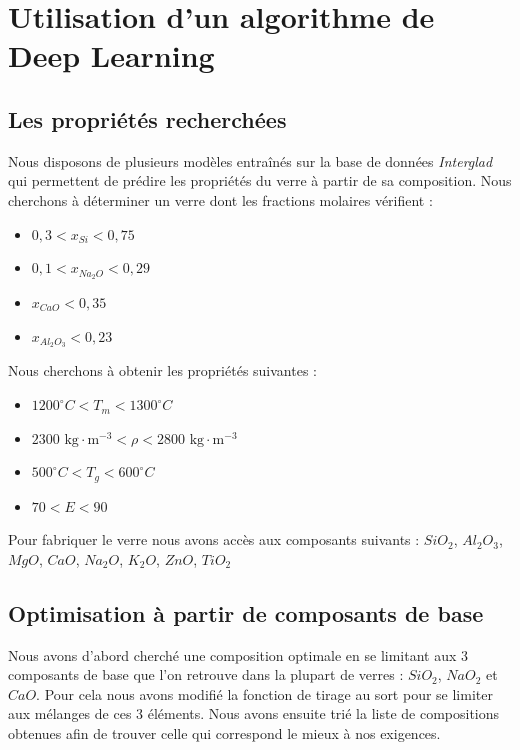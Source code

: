 \documentclass{article}
\begin{document}
\section{Utilisation d'un algorithme de Deep Learning}
\subsection{Les propriétés recherchées}

Nous disposons de plusieurs modèles entraînés sur la base de données \textit{Interglad} qui permettent de prédire les propriétés du verre à partir de sa composition. Nous cherchons à déterminer un verre dont les fractions molaires vérifient :

\begin{itemize}
    \item $0,3 < x_{Si} < 0,75$
    \item $0,1 < x_{Na_2O} < 0,29$
    \item $x_{CaO} < 0,35$
    \item $x_{Al_2O_3} < 0,23$
\end{itemize} 

Nous cherchons à obtenir les propriétés suivantes :

\begin{itemize}
    \item $1200 ^{\circ} C < T_m < 1300 ^{\circ} C$
    \item $2300 \text{ kg} \cdot \text{m}^{-3} < \rho < 2800 \text{ kg} \cdot \text{m}^{-3}$
    \item $500 ^{\circ} C < T_g < 600 ^{\circ} C$
    \item $70 < E < 90$
\end{itemize}

Pour fabriquer le verre nous avons accès aux composants suivants : $SiO_2$, $Al_2O_3$, $MgO$, $CaO$, $Na_2O$, $K_2O$, $ZnO$, $TiO_2$

\subsection{Optimisation à partir de composants de base}

Nous avons d'abord cherché une composition optimale en se limitant aux 3 composants de base que l'on retrouve dans la plupart de verres : $SiO_2$, $NaO_2$ et $CaO$. Pour cela nous avons modifié la fonction de tirage au sort pour se limiter aux mélanges de ces 3 éléments. Nous avons ensuite trié la liste de compositions obtenues afin de trouver celle qui correspond le mieux à nos exigences.
\end{document}
